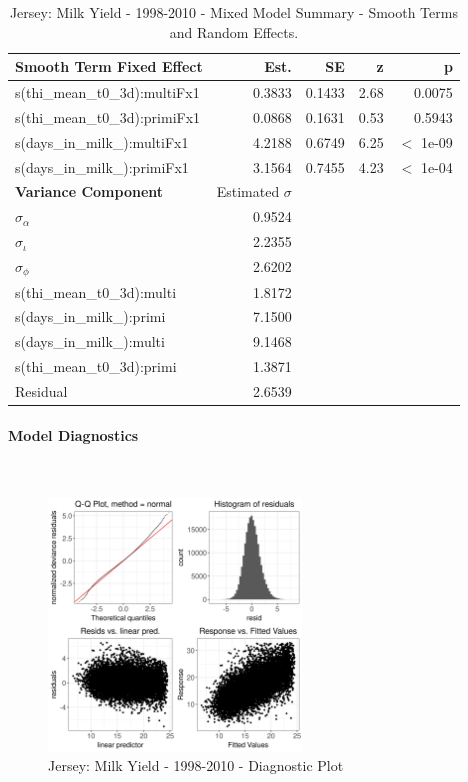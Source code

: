 \newpage
\begin{table}[H]
\centering
\begin{tabular}
{l | r | r | r | r}
\textbf{Smooth Term Fixed Effect} & Est. & SE & z & p\\
\hline
\hline
s(thi\_mean\_t0\_3d):multiFx1& 0.3833 & 0.1433 & 2.68 & 0.0075\\
s(thi\_mean\_t0\_3d):primiFx1 & 0.0868 & 0.1631 & 0.53 & 0.5943\\
s(days\_in\_milk\_):multiFx1 & 4.2188 & 0.6749 & 6.25 & $<$ 1e-09\\
s(days\_in\_milk\_):primiFx1 & 3.1564 & 0.7455 & 4.23 & $<$ 1e-04\\
\hline
\textbf{Variance Component} & Estimated $\sigma$ & & & \\
\hline
\hline
$\sigma_\alpha$ & 0.9524 & &  & \\
$\sigma_\iota$ & 2.2355 & & & \\
$\sigma_\phi$ & 2.6202 & & & \\
s(thi\_mean\_t0\_3d):multi & 1.8172 & & & \\
s(days\_in\_milk\_):primi & 7.1500 & & & \\
s(days\_in\_milk\_):multi & 9.1468 & & & \\
s(thi\_mean\_t0\_3d):primi & 1.3871 & & & \\
Residual & 2.6539 & & & \\
\end{tabular}
\caption[]{Jersey: Milk Yield - 1998-2010 - Mixed Model Summary - Smooth Terms and Random Effects.}
\end{table}

\paragraph{Model Diagnostics} \quad \\
\begin{figure}[H]
    \centering
    \includegraphics[width=0.6\textwidth]{thesis/figures/models/milk/before2010/je_milk_before2010/je_milk_before2010_diagnostics.png}
    \caption[]{Jersey: Milk Yield - 1998-2010 - Diagnostic Plot}
\end{figure}

